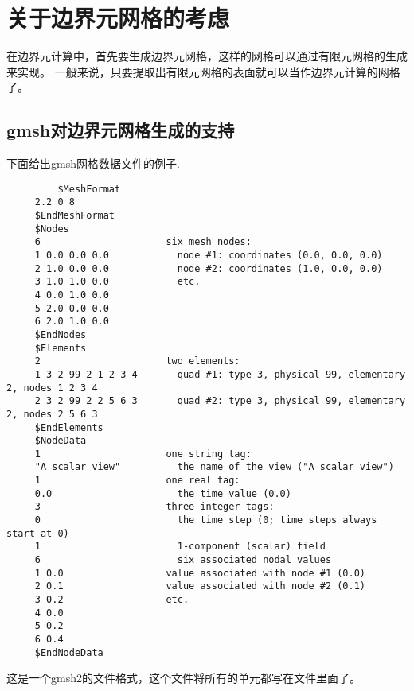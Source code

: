 

\section{关于边界元网格的考虑}

在边界元计算中，首先要生成边界元网格，这样的网格可以通过有限元网格的生成来实现。
一般来说，只要提取出有限元网格的表面就可以当作边界元计算的网格了。

\subsection{gmsh对边界元网格生成的支持}
下面给出gmsh网格数据文件的例子\cite{geuzaine2009gmsh}.
\begin{lstlisting}
		 $MeshFormat
     2.2 0 8
     $EndMeshFormat
     $Nodes
     6                      six mesh nodes:
     1 0.0 0.0 0.0            node #1: coordinates (0.0, 0.0, 0.0)
     2 1.0 0.0 0.0            node #2: coordinates (1.0, 0.0, 0.0)
     3 1.0 1.0 0.0            etc.
     4 0.0 1.0 0.0
     5 2.0 0.0 0.0
     6 2.0 1.0 0.0
     $EndNodes
     $Elements
     2                      two elements:
     1 3 2 99 2 1 2 3 4       quad #1: type 3, physical 99, elementary 2, nodes 1 2 3 4
     2 3 2 99 2 2 5 6 3       quad #2: type 3, physical 99, elementary 2, nodes 2 5 6 3
     $EndElements
     $NodeData
     1                      one string tag:
     "A scalar view"          the name of the view ("A scalar view")
     1                      one real tag:
     0.0                      the time value (0.0)
     3                      three integer tags:
     0                        the time step (0; time steps always start at 0)
     1                        1-component (scalar) field
     6                        six associated nodal values
     1 0.0                  value associated with node #1 (0.0)
     2 0.1                  value associated with node #2 (0.1)
     3 0.2                  etc.
     4 0.0
     5 0.2
     6 0.4
     $EndNodeData	
\end{lstlisting}
这是一个gmsh2的文件格式，这个文件将所有的单元都写在文件里面了。
